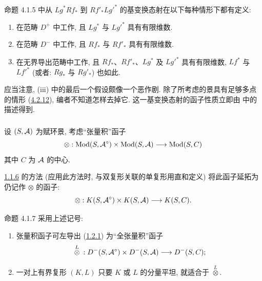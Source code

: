 \begin{enonce*}{命题 4.1.5}
 中从 $Lg^{\ast}Rf_{\ast}$ 到 $Rf'_{\ast}L{g'}^{\ast}$ 的基变换态射在以下每种情形下都有定义:
\begin{enumerate}
\renewcommand{\theenumi}{\roman{enumi}}
\renewcommand{\labelenumi}{(\theenumi)}
\item 在范畴 $D^{+}$ 中工作, 且 $Lg^{\ast}$ 与 $L{g'}^{\ast}$ 具有有限维数.

\item 在范畴 $D^{-}$ 中工作, 且 $Rf_{\ast}$ 与 $Rf'_{\ast}$ 具有有限维数.

\item 在无界导出范畴中工作, 且 $Rf_{\ast}$、$Rf'_{\ast}$、$Lg^{\ast}$ 及 $L{g'}^{\ast}$ 具有有限维数, $Lf^{\ast}$ 与 $L{f'}^{\ast}$ (或者: $Rg_{\ast}$ 与 $Rg'_{\ast}$) 也如此.
\end{enumerate}
\end{enonce*}

应当\pageoriginale 注意, (iii) 中的最后一个假设颇像一个恶作剧. 除了所考虑的景具有足够多点的情形 (\hyperref[XVII.subsubsec4.2.12]{4.2.12}), 编者不知道怎样去掉它. 这一基变换态射的函子性质立即由  中的描述得到.

\setcounter{subsubsection}{5}
\subsubsection{}
设 $(S,\Aa)$ 为赋环景, 考虑“张量积”函子
\[
\otimes:\Mod\sisi{_d}{}(S,\Aa^{\circ})\times
\Mod\sisi{_g}{}(S,\Aa)\longrightarrow \Mod(S,C)
\]%
其中 $C$ 为 $\Aa$ 的中心.

\hyperref[XVII.subsubsec1.1.6]{1.1.6} 的方法 (应用此方法时, 与双复形关联的单复形用直和定义) 将此函子延拓为仍记作 $\otimes$ 的函子:
\[
\otimes:K(S,\Aa^{\circ})\times K(S,\Aa)\longrightarrow
K(S,C){\quoi}.
\]

\begin{enonce*}{命题 4.1.7}
采用上述记号:
\begin{enumerate}
\renewcommand{\theenumi}{\roman{enumi}}
\renewcommand{\labelenumi}{(\theenumi)}
\item 张量积函子可左导出 (\hyperref[XVII.def1.2.1]{1.2.1}) 为“全张量积”函子
\[
{}\overset{L}{\otimes}{}:D^{-}(S,\Aa^{\circ})\times
D^{-}(S,\Aa)\longrightarrow D^{-}(S,C){\quoi}\text{;}
\]

\item 一对上有界复形 $(K,L)$ 只要 $K$ 或 $L$ 的分量平坦, 就适合于 $\overset{L}{\otimes}$.
\end{enumerate}
\end{enonce*}

